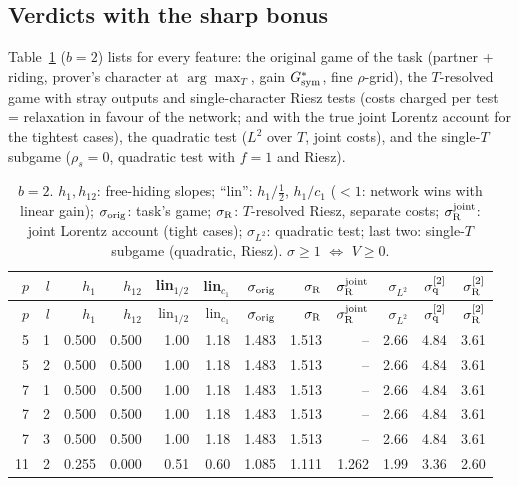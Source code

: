 \documentclass[11pt]{article}
\theoremstyle{definition}
\begin{document}
\subsection{Verdicts with the sharp bonus}
Table~\ref{tab:main} ($b=2$) lists for every feature: the original game of the task (partner + riding, prover's character at $\arg\max_T$, gain
$G^*_{\rm sym}$, fine $\rho$-grid), the $T$-resolved game with stray outputs and single-character Riesz tests (costs charged per test = relaxation in favour of the
network; and with the true joint Lorentz account for the tightest cases), the quadratic test ($L^2$ over $T$, joint costs), and the single-$T$ subgame
($\rho_s=0$, quadratic test with $f=1$ and Riesz).
\begin{center}\footnotesize\setlength{\tabcolsep}{3.5pt}
\begin{longtable}{rr|rr|rr|r|rr|r|rr}
\caption{$b=2$.  $h_1,h_{12}$: free-hiding slopes; ``lin'': $h_1/\frac12$, $h_1/c_1$ ($<1$: network wins with linear gain);
$\sigma_{\rm orig}$: task's game; $\sigma_{\rm R}$: $T$-resolved Riesz, separate costs; $\sigma_{\rm R}^{\rm joint}$: joint Lorentz account (tight cases);
$\sigma_{L^2}$: quadratic test; last two: single-$T$ subgame (quadratic, Riesz).  $\sigma\ge1$ $\Leftrightarrow$ $V\ge0$.}\label{tab:main}\\
\toprule
$p$ & $l$ & $h_1$ & $h_{12}$ & lin$_{1/2}$ & lin$_{c_1}$ & $\sigma_{\rm orig}$ & $\sigma_{\rm R}$ & $\sigma_{\rm R}^{\rm joint}$ & $\sigma_{L^2}$ & $\sigma^{[2]}_{\rm q}$ & $\sigma^{[2]}_{\rm R}$\\
\midrule
\endfirsthead
\toprule
$p$ & $l$ & $h_1$ & $h_{12}$ & lin$_{1/2}$ & lin$_{c_1}$ & $\sigma_{\rm orig}$ & $\sigma_{\rm R}$ & $\sigma_{\rm R}^{\rm joint}$ & $\sigma_{L^2}$ & $\sigma^{[2]}_{\rm q}$ & $\sigma^{[2]}_{\rm R}$\\
\midrule
\endhead
5 & 1 & 0.500 & 0.500 & 1.00 & 1.18 & 1.483 & 1.513 & -- & 2.66 & 4.84 & 3.61\\
5 & 2 & 0.500 & 0.500 & 1.00 & 1.18 & 1.483 & 1.513 & -- & 2.66 & 4.84 & 3.61\\
7 & 1 & 0.500 & 0.500 & 1.00 & 1.18 & 1.483 & 1.513 & -- & 2.66 & 4.84 & 3.61\\
7 & 2 & 0.500 & 0.500 & 1.00 & 1.18 & 1.483 & 1.513 & -- & 2.66 & 4.84 & 3.61\\
7 & 3 & 0.500 & 0.500 & 1.00 & 1.18 & 1.483 & 1.513 & -- & 2.66 & 4.84 & 3.61\\
11 & 2 & 0.255 & 0.000 & 0.51 & 0.60 & 1.085 & 1.111 & 1.262 & 1.99 & 3.36 & 2.60\\

\end{longtable}
\end{center}
\end{document}
